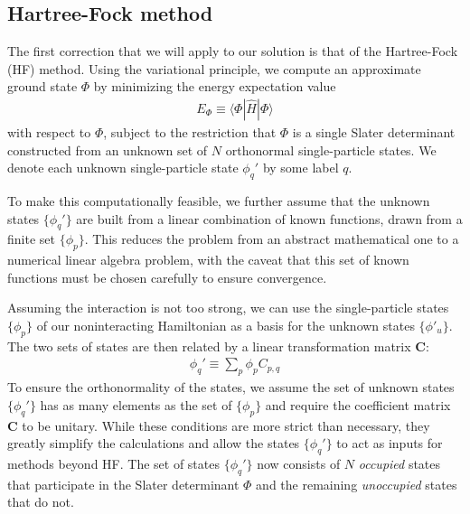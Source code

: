 \subsection{Hartree-Fock method}
\label{subsec:HartreeFockmethod}

The first correction that we will apply to our solution is that of the
Hartree-Fock (HF) method.  Using the variational principle, we compute an
approximate ground state $\Phi$ by minimizing the energy expectation value
\begin{align*}
  E_{\Phi} \equiv \langle \Phi | \hat H | \Phi \rangle
\end{align*}
with respect to $\Phi$, subject to the restriction that
$\Phi$ is a single Slater determinant constructed from an unknown
set of $N$ orthonormal single-particle states.  We denote each unknown
single-particle state $\phi_{q}'$ by some label $q$.

To make this computationally feasible, we further assume that the unknown
states $\{\phi_q'\}$ are built from a linear combination of known functions,
drawn from a finite set $\{\phi_p\}$.  This reduces the problem from an
abstract mathematical one to a numerical linear algebra problem, with the
caveat that this set of known functions must be chosen carefully to ensure
convergence.

Assuming the interaction is not too strong, we can use the single-particle
states $\{\phi_p\}$ of our noninteracting Hamiltonian as a basis for the
unknown states $\{\phi'_u\}$.  The two sets of states are then related by a
linear transformation matrix $\bm C$:
\begin{align*}
  \phi_q' \equiv \sum_p \phi_p C_{p, q}
\end{align*}
To ensure the orthonormality of the states, we assume the set of unknown states $\{\phi_q'\}$ has as many elements as the set of $\{\phi_p\}$ and require the coefficient matrix $\bm C$ to be unitary.  While these conditions are more strict than necessary, they greatly simplify the calculations and allow the states $\{\phi_q'\}$ to act as inputs for methods beyond HF.  The set of states $\{\phi_q'\}$ now consists of $N$ \textit{occupied} states that participate in the Slater determinant $\Phi$ and the remaining \textit{unoccupied} states that do not.


